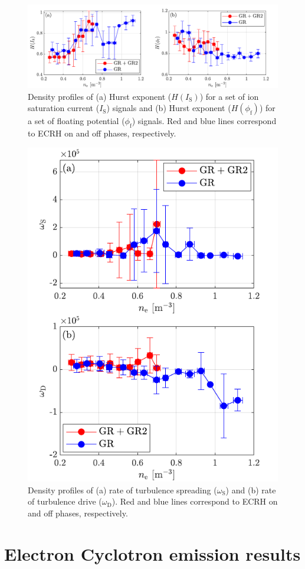 \documentclass[preprint,12pt,authoryear]{elsarticle}
\begin{document}
\begin{figure}[!ht]

   \includegraphics[width=1.0\columnwidth]{Images/transition_4.pdf}
   \caption{Density profiles of (a) Hurst exponent ($H(I_\mathrm{S})$) for a set of ion saturation current ($I_\mathrm{S}$) signals and 
                                (b) Hurst exponent ($H(\phi_\mathrm{f})$) for a set of floating potential ($\phi_\mathrm{f}$) signals.
                                Red and blue lines correspond to ECRH on and off phases, respectively.}
   \label{Fig:transition_4}
\end{figure}
\begin{figure}[!ht]

   \includegraphics[width=0.5\columnwidth]{Images/transition_5.pdf}
   \caption{Density profiles of (a) rate of turbulence spreading ($\omega_\mathrm{S}$) and 
                                (b) rate of turbulence drive ($\omega_\mathrm{D}$). 
                                Red and blue lines correspond to ECRH on and off phases, respectively.}
   \label{Fig:transition_5}
\end{figure}


\clearpage
\section{Electron Cyclotron emission results}
\end{document}
